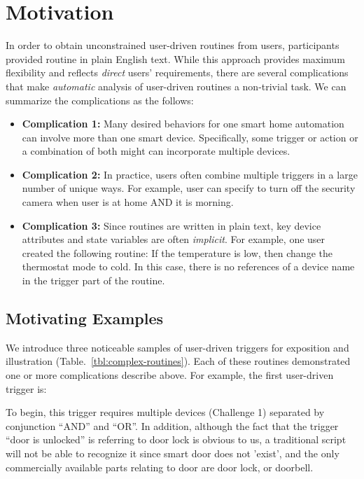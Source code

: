 \section{Motivation}
\label{sec:motivation}




In order to obtain unconstrained user-driven routines from users, participants provided routine in plain English text. While this approach provides maximum flexibility and reflects \textit{direct} users' requirements, there are several complications that make \textit{automatic} analysis of user-driven routines a non-trivial task.
We can summarize the complications as the follows:
\begin{itemize}
    \item \textbf{Complication 1:} Many desired behaviors for one smart home automation can involve more than one smart device. Specifically, some trigger or action or a combination of both might can incorporate multiple devices.

    \item \textbf{Complication 2:} In practice, users often combine multiple triggers in a large number of unique ways. For example, user can specify to turn off the security camera when user is at home AND it is morning. 

    \item \textbf{Complication 3:} Since routines are written in plain text, key device attributes and state variables are often \textit{implicit}. For example, one user created the following routine: If the temperature is low, then change the thermostat mode to cold. In this case, there is no references of a device name in the trigger part of the routine. 
\end{itemize}

\subsection{Motivating Examples}
We introduce three noticeable samples of user-driven triggers for exposition and illustration (Table.~\ref{tbl:complex-routines}). Each of these routines demonstrated one or more complications describe above. For example, the first user-driven trigger is:
\noindent{}

To begin, this trigger requires multiple devices (Challenge 1) separated by conjunction ``AND'' and ``OR''. In addition, although the fact that the trigger ``door is unlocked'' is referring to door lock is obvious to us, a traditional script will not be able to recognize it since smart door does not 'exist', and the only commercially available parts relating to door are door lock, or doorbell. 

